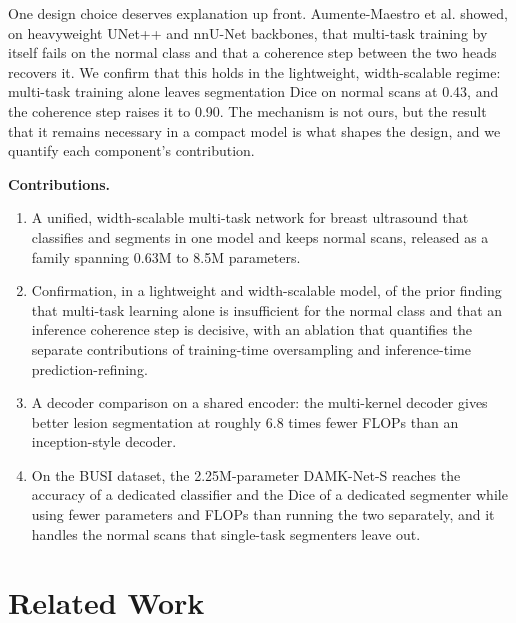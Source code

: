 \documentclass[runningheads]{llncs}
\begin{document}
One design choice deserves explanation up front. Aumente-Maestro et al.
\cite{CMPB} showed, on heavyweight UNet++ and nnU-Net backbones, that multi-task
training by itself fails on the normal class and that a coherence step between
the two heads recovers it. We confirm that this holds in the lightweight,
width-scalable regime: multi-task training alone leaves segmentation Dice on
normal scans at 0.43, and the coherence step raises it to 0.90. The mechanism is
not ours, but the result that it remains necessary in a compact model is what
shapes the design, and we quantify each component's contribution.

\medskip\noindent\textbf{Contributions.}
\begin{enumerate}
\item A unified, width-scalable multi-task network for breast ultrasound that
classifies and segments in one model and keeps normal scans, released as a family
spanning 0.63M to 8.5M parameters.
\item Confirmation, in a lightweight and width-scalable model, of the prior
finding \cite{CMPB} that multi-task learning alone is insufficient for the normal
class and that an inference coherence step is decisive, with an ablation that
quantifies the separate contributions of training-time oversampling and
inference-time prediction-refining.
\item A decoder comparison on a shared encoder: the multi-kernel decoder gives
better lesion segmentation at roughly 6.8 times fewer FLOPs than an
inception-style decoder.
\item On the BUSI dataset, the 2.25M-parameter DAMK-Net-S reaches the accuracy of
a dedicated classifier and the Dice of a dedicated segmenter while using fewer
parameters and FLOPs than running the two separately, and it handles the normal
scans that single-task segmenters leave out.
\end{enumerate}

\section{Related Work}
\end{document}

